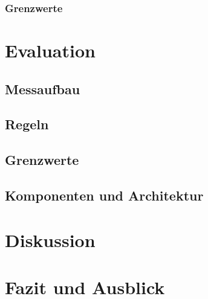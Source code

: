 \documentclass[a4paper,12pt]{scrartcl}
\begin{document}
\subsubsection{Grenzwerte}

\section{Evaluation}
\subsection{Messaufbau}
\subsection{Regeln}
\subsection{Grenzwerte}
\subsection{Komponenten und Architektur}

\section{Diskussion}
\section{Fazit und Ausblick}

\newpage

\end{document}
